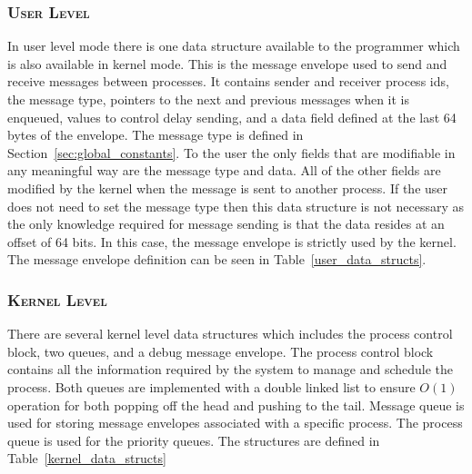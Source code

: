 \documentclass[oneside]{report}
\begin{document}
\subsubsection{\textsc{User Level}}
In user level mode there is one data structure available to the programmer
which is also available in kernel mode. This is the message envelope used to
send and receive messages between processes. It contains sender and receiver
process ids, the message type, pointers to the next and previous messages when
it is enqueued, values to control delay sending, and a data field defined at
the last 64 bytes of the envelope. The message type is defined in
Section~\ref{sec:global_constants}. To the user the only fields that are
modifiable in any meaningful way are the message type and data. All of the
other fields are modified by the kernel when the message is sent to another
process. If the user does not need to set the message type then this data
structure is not necessary as the only knowledge required for message sending
is that the data resides at an offset of 64 bits. In this case, the message
envelope is strictly used by the kernel. The message envelope definition can be
seen in Table~\ref{user_data_structs}.

\begin{table}[H]
    \caption{User Level Data Structure}
    \label{user_data_structs}
\end{table}

\subsubsection{\textsc{Kernel Level}}
There are several kernel level data structures which includes the process
control block, two queues, and a debug message envelope. The process control
block contains all the information required by the system to manage and
schedule the process. Both queues are implemented with a double linked list to
ensure $O(1)$ operation for both popping off the head and pushing to the tail.
Message queue is used for storing message envelopes associated with a specific
process. The process queue is used for the priority queues. The structures are
defined in Table~\ref{kernel_data_structs}
\end{document}
